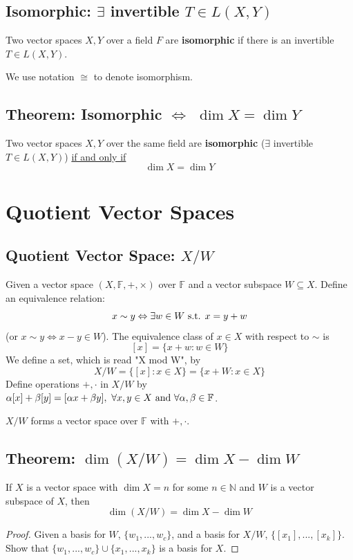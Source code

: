 \documentclass[11pt]{elegantbook}
\begin{document}
\subsection{Isomorphic: $\exists$ invertible $T \in L(X, Y)$}
\begin{definition}[Isomorphisms]
    \normalfont
    Two vector spaces $X, Y$ over a field $F$ are \textbf{isomorphic} if there is an invertible $T \in L(X, Y)$.
\end{definition}
We use notation $\cong$ to denote isomorphism.

\subsection{Theorem: Isomorphic $\Leftrightarrow$ $\dim X = \dim Y$}
\begin{theorem}[Isomorphic $\Leftrightarrow$ $\dim X = \dim Y$]
    Two vector spaces $X, Y$ over the same field are \textbf{isomorphic} ($\exists$ invertible $T \in L(X, Y)$) \underline{if and only if} $$\dim X = \dim Y$$
\end{theorem}


\section{Quotient Vector Spaces}
\subsection{Quotient Vector Space: $X/W$}
Given a vector space $(X,\mathbb{F},+,\times)$ over $\mathbb{F}$ and a vector subspace $W\subseteq X$. Define an equivalence relation: $$x\sim y \Leftrightarrow \exists w\in W \textnormal{ s.t. }x=y+w$$
(or $x\sim y \Leftrightarrow x-y\in W$). The equivalence class of $x\in X$ with respect to $\sim$ is $$[x]=\{x+w:w\in W\}$$
We define a set, which is read "X mod W", by $$X/W=\{[x]:x\in X\}=\{x+W:x\in X\}$$
Define operations $+,\cdot$ in $X/W$ by $\alpha[x]+\beta[y]=[\alpha x +\beta y],\ \forall x,y\in X \textnormal{ and }\forall \alpha,\beta\in \mathbb{F}$.
\begin{definition}
    \normalfont
    $X/W$ forms a vector space over $\mathbb{F}$ with $+,\cdot$.
\end{definition}

\subsection{Theorem: $\dim(X/W)=\dim X - \dim W$}
\begin{theorem}[$\dim(X/W)=\dim X - \dim W$]
    If $X$ is a vector space with $\dim X = n$ for some $n \in \mathbb{N}$ and $W$ is a vector subspace of $X$, then $$\dim(X/W)=\dim X - \dim W$$
\end{theorem}
\begin{proof}
    Given a basis for $W$, $\{w_1,...,w_c\}$, and a basis for $X/W$, $\{[x_1],...,[x_k]\}$. Show that $\{w_1,...,w_c\}\cup\{x_1,...,x_k\}$ is a basis for $X$.
\end{proof}
\end{document}
